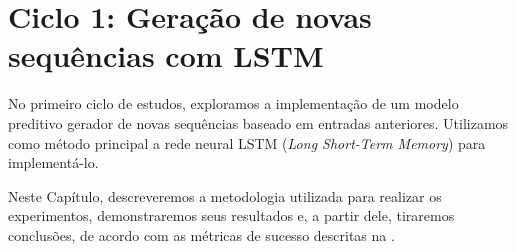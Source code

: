 \chapter{Ciclo 1: Geração de novas sequências com LSTM}
\label{chap:lstm}

No primeiro ciclo de estudos, exploramos a implementação de um modelo preditivo gerador de novas sequências baseado em entradas anteriores. Utilizamos como método principal a rede neural LSTM (\textit{Long Short-Term Memory}) para implementá-lo.

Neste Capítulo, descreveremos a metodologia utilizada para realizar os experimentos, demonstraremos seus resultados e, a partir dele, tiraremos conclusões, de acordo com as métricas de sucesso descritas na .


